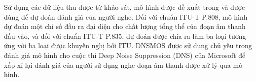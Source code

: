 		
		Sử dụng các dữ liệu thu được từ khảo sát, mô hình được đề xuất trong \cite{dnsmos} và \cite{dnsmos_p835} được dùng để dự đoán đánh giá của người nghe. Đối với chuẩn ITU-T P.808, mô hình dự đoán một chỉ số đầu ra đại diện cho chất lượng tổng thể của đoạn âm thanh đầu vào, và đối với chuẩn ITU-T P.835, dự đoán được chia ra làm ba loại tương ứng với ba loại được khuyến nghị bởi ITU. DNSMOS được sử dụng chủ yếu trong đánh giá mô hình cho cuộc thi Deep Noise Suppression (DNS) \cite{dns} của Microsoft để xấp xỉ lại đánh giá của người sử dụng nghe đoạn âm thanh được xử lý qua mô hình.
		
	
